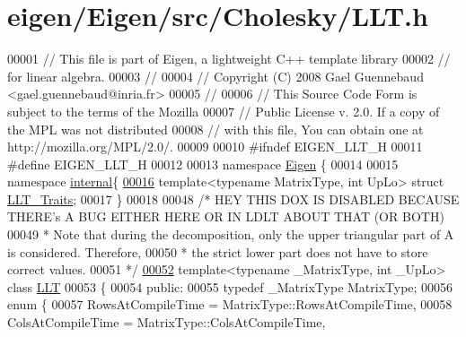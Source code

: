 \hypertarget{eigen_2_eigen_2src_2_cholesky_2_l_l_t_8h_source}{}\section{eigen/\+Eigen/src/\+Cholesky/\+L\+LT.h}
\label{eigen_2_eigen_2src_2_cholesky_2_l_l_t_8h_source}

\begin{DoxyCode}
00001 \textcolor{comment}{// This file is part of Eigen, a lightweight C++ template library}
00002 \textcolor{comment}{// for linear algebra.}
00003 \textcolor{comment}{//}
00004 \textcolor{comment}{// Copyright (C) 2008 Gael Guennebaud <gael.guennebaud@inria.fr>}
00005 \textcolor{comment}{//}
00006 \textcolor{comment}{// This Source Code Form is subject to the terms of the Mozilla}
00007 \textcolor{comment}{// Public License v. 2.0. If a copy of the MPL was not distributed}
00008 \textcolor{comment}{// with this file, You can obtain one at http://mozilla.org/MPL/2.0/.}
00009 
00010 \textcolor{preprocessor}{#ifndef EIGEN\_LLT\_H}
00011 \textcolor{preprocessor}{#define EIGEN\_LLT\_H}
00012 
00013 \textcolor{keyword}{namespace }\hyperlink{namespace_eigen}{Eigen} \{
00014 
00015 \textcolor{keyword}{namespace }\hyperlink{namespaceinternal}{internal}\{
\hyperlink{struct_eigen_1_1internal_1_1_l_l_t___traits}{00016} \textcolor{keyword}{template}<\textcolor{keyword}{typename} MatrixType, \textcolor{keywordtype}{int} UpLo> \textcolor{keyword}{struct }\hyperlink{struct_eigen_1_1internal_1_1_l_l_t___traits}{LLT\_Traits};
00017 \}
00018 
00048  \textcolor{comment}{/* HEY THIS DOX IS DISABLED BECAUSE THERE's A BUG EITHER HERE OR IN LDLT ABOUT THAT (OR BOTH)}
00049 \textcolor{comment}{  * Note that during the decomposition, only the upper triangular part of A is considered. Therefore,}
00050 \textcolor{comment}{  * the strict lower part does not have to store correct values.}
00051 \textcolor{comment}{  */}
\hyperlink{group___cholesky___module}{00052} \textcolor{keyword}{template}<\textcolor{keyword}{typename} \_MatrixType, \textcolor{keywordtype}{int} \_UpLo> \textcolor{keyword}{class }\hyperlink{group___cholesky___module_class_eigen_1_1_l_l_t}{LLT}
00053 \{
00054   \textcolor{keyword}{public}:
00055     \textcolor{keyword}{typedef} \_MatrixType MatrixType;
00056     \textcolor{keyword}{enum} \{
00057       RowsAtCompileTime = MatrixType::RowsAtCompileTime,
00058       ColsAtCompileTime = MatrixType::ColsAtCompileTime,

\end{DoxyCode}
